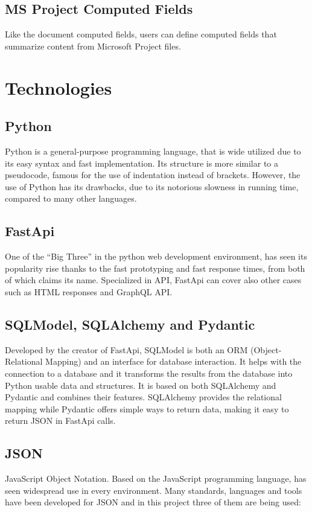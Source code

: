 \documentclass[12pt]{report}
\begin{document}
\subsection{MS Project Computed Fields}
Like the document computed fields, users can define computed fields that summarize content from Microsoft Project files.

\section{Technologies}

\subsection{Python}
Python is a general-purpose programming language, that is wide utilized due to its easy syntax and fast implementation. Its structure is more similar to a pseudocode, famous for the use of indentation instead of brackets. However, the use of Python has its drawbacks, due to its notorious slowness in running time, compared to many other languages.

\subsection{FastApi}
One of the “Big Three” in the python web development environment, has seen its popularity rise thanks to the fast prototyping and fast response times, from both of which claims its name. Specialized in API, FastApi can cover also other cases such as HTML responses and GraphQL API.

\subsection{SQLModel, SQLAlchemy and Pydantic}
Developed by the creator of FastApi, SQLModel is both an ORM (Object-Relational Mapping) and an interface for database interaction. It helps with the connection to a database and it transforms the results from the database into Python usable data and structures. It is based on both SQLAlchemy and Pydantic and combines their features. SQLAlchemy provides the relational mapping while Pydantic offers simple ways to return data, making it easy to return JSON in FastApi calls.

\subsection{JSON}
JavaScript Object Notation. Based on the JavaScript programming language, has seen widespread use in every environment. Many standards, languages and tools have been developed for JSON and in this project three of them are being used:
\end{document}
